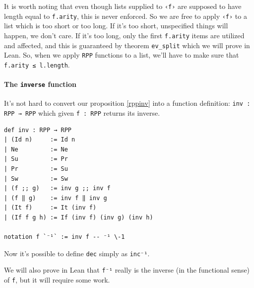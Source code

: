 \documentclass{book}
\theoremstyle{definition}
\theoremstyle{remark}
\theoremstyle{plain}
\begin{document}
It is worth noting that even though lists supplied to \lstinline{‹f›} are supposed to have length equal to \lstinline{f.arity},
this is never enforced.
So we are free to apply \lstinline{‹f›} to a list which is too short or too long.
If it's too short, unspecified things will happen, we don't care.
If it's too long, only the first \lstinline{f.arity} items are utilized and affected,
and this is guaranteed by theorem \lstinline{ev_split} which we will prove in Lean.
So, when we apply \lstinline{RPP} functions to a list, we'll have to make sure that
\lstinline{f.arity ≤ l.length}.

\paragraph{The \lstinline{inverse} function}
It's not hard to convert our proposition \ref{rppinv} into a function definition:
\lstinline{inv : RPP → RPP} which given \lstinline{f : RPP} returns its inverse.
\begin{lstlisting}
def inv : RPP → RPP
| (Id n)     := Id n
| Ne         := Ne
| Su         := Pr
| Pr         := Su
| Sw         := Sw
| (f ;; g)   := inv g ;; inv f
| (f ‖ g)    := inv f ‖ inv g
| (It f)     := It (inv f)
| (If f g h) := If (inv f) (inv g) (inv h)

notation f `⁻¹` := inv f -- ⁻¹ \-1
\end{lstlisting}
Now it's possible to define \lstinline{dec} simply as \lstinline{inc⁻¹}.

We will also prove in Lean that \lstinline{f⁻¹} really is the inverse (in the functional sense) of \lstinline{f},
but it will require some work.
\end{document}
